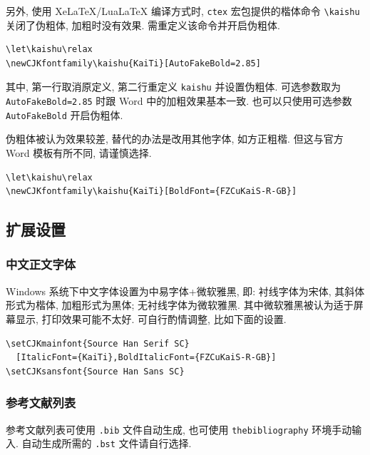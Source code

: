 \documentclass{article}
\let\kaishu\relax\newCJKfontfamily\kaishu{KaiTi}[AutoFakeBold=2.85] %
\begin{document}
另外, 使用 XeLaTeX/LuaLaTeX 编译方式时, \verb'ctex' 宏包提供的楷体命令 \verb'\kaishu' 关闭了伪粗体, 加粗时没有效果.
需重定义该命令并开启伪粗体.
\begin{verbatim}
\let\kaishu\relax
\newCJKfontfamily\kaishu{KaiTi}[AutoFakeBold=2.85]
\end{verbatim}
其中, 第一行取消原定义, 第二行重定义 \verb'kaishu' 并设置伪粗体.
可选参数取为 \verb'AutoFakeBold=2.85' 时跟 Word 中的加粗效果基本一致.
也可以只使用可选参数 \verb'AutoFakeBold' 开启伪粗体.

伪粗体被认为效果较差, 替代的办法是改用其他字体, 如方正粗楷.
但这与官方 Word 模板有所不同, 请谨慎选择.
\begin{verbatim}
\let\kaishu\relax
\newCJKfontfamily\kaishu{KaiTi}[BoldFont={FZCuKaiS-R-GB}]
\end{verbatim}

\subsection{扩展设置}

\subsubsection{中文正文字体}

Windows 系统下中文字体设置为中易字体+微软雅黑, 即: 衬线字体为宋体, 其斜体形式为楷体, 加粗形式为黑体; 无衬线字体为微软雅黑.
其中微软雅黑被认为适于屏幕显示, 打印效果可能不太好.
可自行酌情调整, 比如下面的设置.
\begin{verbatim}
\setCJKmainfont{Source Han Serif SC}
  [ItalicFont={KaiTi},BoldItalicFont={FZCuKaiS-R-GB}]
\setCJKsansfont{Source Han Sans SC}
\end{verbatim}

\subsubsection{参考文献列表}

参考文献列表可使用 \verb'.bib' 文件自动生成, 也可使用 \verb'thebibliography' 环境手动输入.
自动生成所需的 \verb'.bst' 文件请自行选择.
\end{document}
